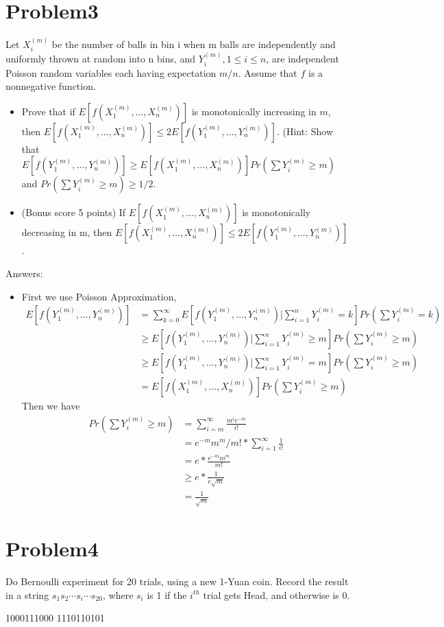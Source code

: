 \documentclass[12pt]{article}
\begin{document}
\section{Problem3}
Let $X^{(m)}_i$ be the number of balls in bin i when m balls are independently and uniformly thrown at random into n bins, and $Y^{(m)}_i , 1 \le i \le n$, are independent Poisson random variables each having expectation $m/n$. Assume that $f$ is a nonnegative function.
\begin{itemize}
\item Prove that if $E[f(X_1^{(m)}, \dots, X_n^{(m)})]$ is monotonically increasing in $m$, then $E[f(X_1^{(m)}, \dots, X_n^{(m)})] \le 2E[f(Y_1^{(m)}, \dots, Y_n^{(m)})]$. (Hint: Show that $E[f(Y_1^{(m)}, \dots, Y_n^{(m)})] \ge E[f(X_1^{(m)}, \dots, X_n^{(m)})] Pr(\sum Y_i^{(m)} \ge m)$ and $Pr(\sum Y_i^{(m)} \ge m) \ge 1/2$.
\item (Bonus score 5 points) If $E[f(X_1^{(m)}, \dots, X_n^{(m)})]$ is monotonically decreasing in m, then $E[f(X_1^{(m)}, \dots, X_n^{(m)})] \le 2E[f(Y_1^{(m)}, \dots, Y_n^{(m)})]$.
\end{itemize}

Answers:
\begin{itemize}
\item First we use Poisson Approximation,
\begin{equation}
    \begin{split}
    E[f(Y_1^{(m)}, \dots, Y_n^{(m)})] &= \sum_{k=0}^{\infty} E[f(Y_1^{(m)}, \dots, Y_n^{(m)}) | \sum_{i=1}^{n}Y_{i}^{(m)}=k] Pr(\sum Y_i^{(m)} = k)\\
    &\ge E[f(Y_1^{(m)}, \dots, Y_n^{(m)}) | \sum_{i=1}^{n}Y_{i}^{(m)} \ge m] Pr(\sum Y_i^{(m)} \ge m)\\
    &\ge E[f(Y_1^{(m)}, \dots, Y_n^{(m)}) | \sum_{i=1}^{n}Y_{i}^{(m)} =m] Pr(\sum Y_i^{(m)} \ge m)\\
    &= E[f(X_1^{(m)}, \dots, X_n^{(m)})] Pr(\sum Y_i^{(m)} \ge m)
    \end{split}
\end{equation}
Then we have
\begin{equation}
    \begin{split}
    Pr(\sum Y_i^{(m)} \ge m) &= \sum_{i=m}^{\infty} \frac{m^i e^{-m}}{i!} \\
    &=  e^{-m} m^m / m! * \sum_{i=1}^{\infty} \frac{1}{i!}\\
    &= e*\frac{e^{-m} m^m}{m!} \\
    &\ge e * \frac{1}{e \sqrt{m}} \\
    &=\frac{1}{\sqrt{m}}
    \end{split}
\end{equation}
\end{itemize}

\section{Problem4}
Do Bernoulli experiment for 20 trials, using a new 1-Yuan coin. Record the result in a
string $s_1s_2 \cdots s_i \cdots s_{20}$, where $s_i$ is 1 if the $i^{th}$ trial gets Head, and otherwise is 0.

1000111000 1110110101
\end{document}
